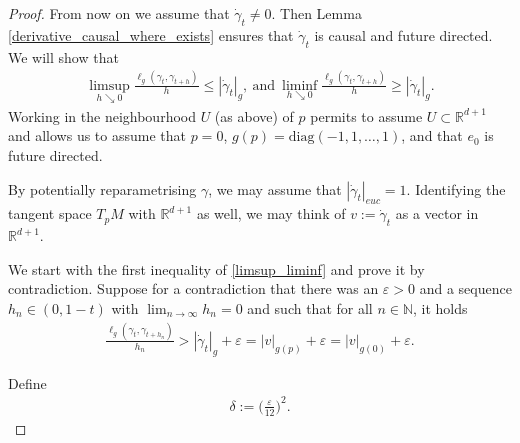 \documentclass[a4paper,10pt]{article}
\numberwithin{equation}{section}
\newcommand{\R}{\mathbb{R}}
\newcommand{\N}{\mathbb{N}}
\newcommand{\e}{\varepsilon}
\newcommand{\diag}{\mathrm{diag}}
\begin{document}
\begin{proof}
    From now on we assume that $\dot{\gamma}_t\neq 0$. Then Lemma \ref{derivative_causal_where_exists} ensures that $\dot{\gamma}_t$ is causal and future directed.
    We will show that 
    \begin{align}\label{limsup_liminf}
         \limsup_{h \searrow 0} \frac{\ell_g(\gamma_t, \gamma_{t+h})}{h} \leq |\dot{\gamma}_t|_g, \ \mathrm{and} \ \liminf_{h \searrow 0} \frac{\ell_g(\gamma_t, \gamma_{t+h})}{h} \geq |\dot{\gamma}_t|_g.
     \end{align}
     Working in the neighbourhood $U$ (as above) of $p$ permits to assume $U \subset \R^{d+1}$ and allows us to assume that $p =0$, $g(p)=\diag(-1, 1, \ldots, 1)$, and that $e_0$ is future directed.
    
    By potentially reparametrising $\gamma$, we may assume that $|\dot{\gamma}_t|_{euc} = 1$.
    Identifying the tangent space $T_pM$ with $\R^{d+1}$ as well, we may think of $v := \dot{\gamma}_t$ as a vector in $\R^{d+1}$. 

     We start with the first inequality of \eqref{limsup_liminf} and prove it by contradiction. Suppose for a contradiction that there was an $\e >0$ and a sequence $h_n \in (0, 1-t)$ with $\lim_{n \to \infty} h_n = 0$ and such that for all $n \in \N$, it holds 
    \begin{align*}
        \frac{\ell_g(\gamma_t, \gamma_{t+h_n})}{h_n} > |\dot{\gamma}_t|_g + \e = |v|_{g(p)} + \e = |v|_{g(0)} + \e.
    \end{align*}

Define 
\begin{align}\label{set_delta_causal_speed}
    \delta := \Big(\frac{\e}{12}\Big)^2.
\end{align}
   

\end{proof}
\end{document}
